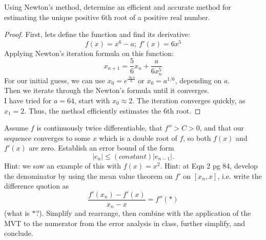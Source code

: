 \documentclass{article}
\begin{document}
\begin{problem}
    Using Newton's method, determine an efficient and accurate method for estimating the unique positive \(6\)th root of a positive real number.
\end{problem}

\begin{proof}
    First, lets define the function and find its derivative: 
    \[ f(x) = x^6 - a; \ f'(x) = 6x^5 \]
    Applying Newton's iteration formula on this function:
    \[ x_{n+1} = \frac{5}{6}x_n + \frac{a}{6x_n^5} \]
    For our initial guess, we can use \( x_0 = e^{\frac{\ln a}{6}} \) or \( x_0 = a^{1/6} \), depending on \(a\).
    \\
    Then we iterate through the Newton's formula until it converges.
    \\
    I have tried for \( a = 64 \), start with \( x_0 \approx 2 \). The iteration converges quickly, as \( x_1 = 2 \). Thus, the method efficiently estimates the \(6\)th root.
\end{proof}


\begin{problem}
     Assume \(f\) is continuously twice differentiable, that \(f'' >C>0\), and that our sequence converges to some \(x\) which is a double root of \(f\), so both \(f(x)\) and \(f'(x)\) are zero. Establish an error bound of the form
    \[|e_n| \leq (constant) |e_{n-1}|.\]
    Hint: we saw an example of this with \(f(x) = x^2\). Hint: at Eqn 2 pg 84, develop the denominator by using the mean value theorem on \(f'\) on \([x_n,x]\), i.e. write the difference quotion as
    \[\frac{f'(x_n) - f'(x)}{x_n-x} = f''(*)\]
    (what is \(*\)?). Simplify and rearrange, then combine with the application of the MVT to the numerator from the error analysis in class, further simplify, and conclude.
\end{problem}
\end{document}
